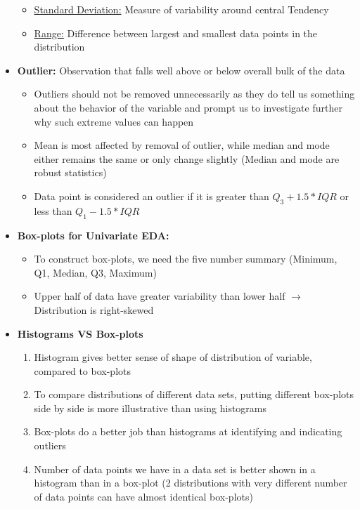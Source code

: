 \documentclass[landscape]{article}
\begin{document}
\begin{multicols*}{5}
\begin{itemize}
\begin{itemize}
        \item \underline{Standard Deviation:} Measure of variability around central Tendency
        \item \underline{Range:} Difference between largest and smallest data points in the distribution
      \end{itemize}
      \item \textbf{Outlier:} Observation that falls well above or below overall bulk of the data 
      \begin{itemize}
        \item Outliers should not be removed unnecessarily as they do tell us something about the behavior of the variable and prompt us to investigate further why such extreme values can happen
        \item Mean is most affected by removal of outlier, while median and mode either remains the same or only change slightly (Median and mode are robust statistics)
        \item Data point is considered an outlier if it is greater than $Q_3 + 1.5*IQR$ or less than $Q_1 - 1.5*IQR$
      \end{itemize}
      \item \textbf{Box-plots for Univariate EDA:}
      \begin{itemize}
        \item To construct box-plots, we need the five number summary (Minimum, Q1, Median, Q3, Maximum)
        \item Upper half of data have greater variability than lower half $\rightarrow$ Distribution is right-skewed
      \end{itemize}
      \item \textbf{Histograms VS Box-plots}
      \begin{enumerate}
        \item Histogram gives better sense of shape of distribution of variable, compared to box-plots
        \item To compare distributions of different data sets, putting different box-plots side by side is more illustrative than using histograms
        \item Box-plots do a better job than histograms at identifying and indicating outliers
        \item Number of data points we have in a data set is better shown in a histogram than in a box-plot (2 distributions with very different number of data points can have almost identical box-plots)
      \end{enumerate}
    \end{itemize}


\end{multicols*}
\end{document}
